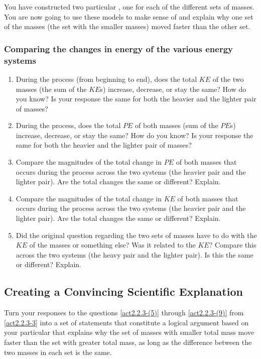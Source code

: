 You have constructed two particular \EnergyInteractionModels{}, one for each of the different sets of masses. You are now going to use these models to make sense of and explain why one set of the masses (the set with the smaller masses) moved faster than the other set.


\subsubsection*{Comparing the changes in energy of the various energy systems}

\begin{enumerate}
	\item During the process (from beginning to end), does the total $KE$ of the two masses (the sum of the $KE$s) increase, decrease, or stay the same? How do you know?  Is your response the same for both the heavier and the lighter pair of masses?
	\label{act2.2.3-(5)}
	
	\item During the process, does the total $PE$ of both masses (sum of the $PE$s) increase, decrease, or stay the same? How do you know?  Is your response the same for both the heavier and the lighter pair of masses?
	
	\item Compare the magnitudes of the total change in $PE$ of both masses that occurs during the process across the two systems (the heavier pair and the lighter pair).  Are the total changes the same or different?  Explain.
	
	\item Compare the magnitudes of the total change in $KE$ of both masses that occurs during the process across the two systems (the heavier pair and the lighter pair).  Are the total changes the same or different?  Explain.
	
	\item Did the original question regarding the two sets of masses have to do with the $KE$ of the masses or something else?  Was it related to the $KE$?  Compare this across the two systems (the heavy pair and the lighter pair).  Is this the same or different?  Explain.
	\label{act2.2.3-(9)}
\end{enumerate}

\subsection{Creating a Convincing Scientific Explanation}
\label{act2.2.3-4}

Turn your responses to the questions \eqref{act2.2.3-(5)} through \eqref{act2.2.3-(9)} from \ref{act2.2.3-3} into a set of statements that constitute a logical argument based on your particular \EnergyInteractionModels{} that explains why the set of masses with smaller total mass move faster than the set with greater total mass, as long as the difference between the two masses in each set is the same.\\

\WCD